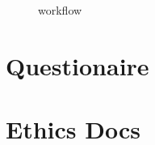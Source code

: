 \begin{appendices}
\begin{figure}[H]
\begin{center}
    \caption{workflow}
    \label{fig:workflow}
  \end{center}
\end{figure}
\chapter{Questionaire}
\thispagestyle{fancy} %

\chapter{Ethics Docs}

\thispagestyle{fancy} %

\end{appendices}
